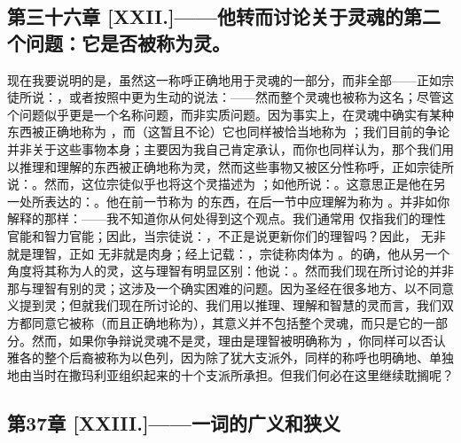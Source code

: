 
\subsection{第三十六章 [XXII.]——他转而讨论关于灵魂的第二个问题：它是否被称为灵。}

现在我要说明的是，虽然这一称呼正确地用于灵魂的一部分，而非全部——正如宗徒所说：，或者按照中更为生动的说法：——然而整个灵魂也被称为这名；尽管这个问题似乎更是一个名称问题，而非实质问题。因为事实上，在灵魂中确实有某种东西被正确地称为 ，而（这暂且不论）它也同样被恰当地称为 ；我们目前的争论并非关于这些事物本身；主要因为我自己肯定承认，而你也同样认为，那个我们用以推理和理解的东西被正确地称为灵，然而这些事物又被区分性称呼，正如宗徒所说：。然而，这位宗徒似乎也将这个灵描述为 ；如他所说：。这意思正是他在另一处所表达的：。他在前一节称为  的东西，在后一节中应理解为称为 。并非如你解释的那样：——我不知道你从何处得到这个观点。我们通常用  仅指我们的理性官能和智力官能；因此，当宗徒说：，不正是说更新你们的理智吗？因此， 无非就是理智，正如  无非就是肉身；经上记载：，宗徒称肉体为 。的确，他从另一个角度将其称为人的灵，这与理智有明显区别：他说：。然而我们现在所讨论的并非那与理智有别的灵；这涉及一个确实困难的问题。因为圣经在很多地方、以不同意义提到灵；但就我们现在所讨论的、我们用以推理、理解和智慧的灵而言，我们双方都同意它被称（而且正确地称为），其意义并不包括整个灵魂，而只是它的一部分。然而，如果你争辩说灵魂不是灵，理由是理智被明确称为 ，你同样可以否认雅各的整个后裔被称为以色列，因为除了犹大支派外，同样的称呼也明确地、单独地由当时在撒玛利亚组织起来的十个支派所承担。但我们何必在这里继续耽搁呢？\par


\subsection{第37章 [XXIII.]——一词的广义和狭义}

